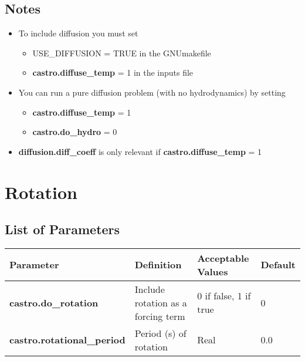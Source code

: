 \subsection{Notes}
\begin{itemize}
\item To include diffusion you must set
\begin{itemize}
\item USE\_DIFFUSION  = TRUE in the GNUmakefile
\item {\bf castro.diffuse\_temp} = 1 in the inputs file
\end{itemize}
\item You can run a pure diffusion problem (with no hydrodynamics) by setting 
\begin{itemize}
\item {\bf castro.diffuse\_temp} = 1
\item {\bf castro.do\_hydro} = 0 
\end{itemize}
\item {\bf diffusion.diff\_coeff} is only relevant if {\bf castro.diffuse\_temp} = 1 
\end{itemize}

\section{Rotation}

\subsection{List of Parameters}

\begin{table*}[h]
\begin{scriptsize}
\begin{center}
\begin{tabular}{|l|l|l|l|}\hline
Parameter & Definition & Acceptable Values & Default\\
\hline
{\bf castro.do\_rotation} & Include rotation as a forcing term & 0 if false, 1 if true & 0 \\
{\bf castro.rotational\_period} & Period (s) of rotation & Real & 0.0 \\
\hline
\end{tabular}
\end{center}
\end{scriptsize}
\end{table*}

